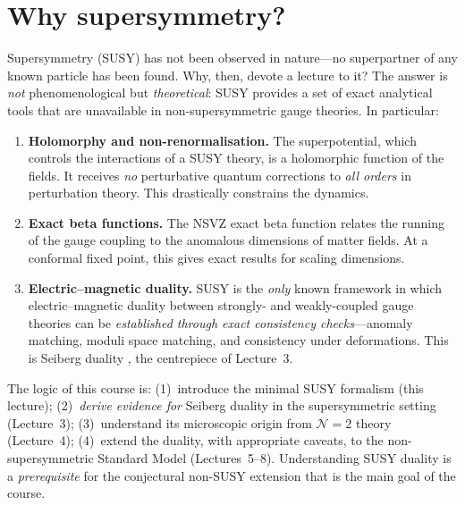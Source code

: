 \documentclass[11pt,a4paper]{article}
\begin{document}
\section{Why supersymmetry?}
\label{sec:motivation}

Supersymmetry (SUSY) has not been observed in nature---no superpartner of
any known particle has been found.  Why, then, devote a lecture to it?
The answer is \emph{not} phenomenological but \emph{theoretical}: SUSY
provides a set of exact analytical tools that are unavailable in
non-supersymmetric gauge theories.  In particular:
\begin{enumerate}[label=(\roman*)]
  \item \textbf{Holomorphy and non-renormalisation.}  The superpotential,
    which controls the interactions of a SUSY theory, is a holomorphic
    function of the fields.  It receives \emph{no} perturbative quantum
    corrections to \emph{all orders} in perturbation theory.  This
    drastically constrains the dynamics.
  \item \textbf{Exact beta functions.}  The NSVZ exact beta function
    relates the running of the gauge coupling to the anomalous dimensions
    of matter fields.  At a conformal fixed point, this gives exact
    results for scaling dimensions.
  \item \textbf{Electric--magnetic duality.}  SUSY is the \emph{only}
    known framework in which electric--magnetic duality between strongly-
    and weakly-coupled gauge theories can be \emph{established through exact consistency checks}---anomaly matching, moduli space matching, and
    consistency under deformations.  This is Seiberg duality
    \cite{Seiberg1995}, the centrepiece of Lecture~3.
\end{enumerate}

\begin{remark}
  The logic of this course is: (1)~introduce the minimal SUSY formalism
  (this lecture); (2)~\emph{derive evidence for} Seiberg duality in the supersymmetric
  setting (Lecture~3); (3)~understand its microscopic origin from $\mathcal{N}=2$
  theory (Lecture~4); (4)~extend the duality, with appropriate caveats,
  to the non-supersymmetric Standard Model (Lectures~5--8).
  Understanding SUSY duality is a \emph{prerequisite} for the conjectural
  non-SUSY extension that is the main goal of the course.
\end{remark}
\end{document}
